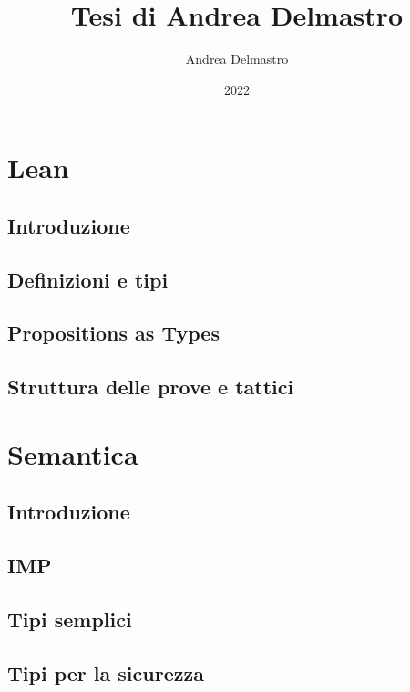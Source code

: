 \documentclass[oneside, 12pt, a4paper]{memoir}
\title{Tesi di Andrea Delmastro}
\author{Andrea Delmastro}
\date{2022}
\begin{document}
\frontmatter

\maketitle

\newpage


\newpage 
{
  \hypersetup{linkcolor=black}
  \tableofcontents
}

\mainmatter

\part{Lean}

\chapter{Introduzione}


\chapter{Definizioni e tipi}


\chapter{Propositions as Types}


\chapter{Struttura delle prove e tattici}


\part{Semantica} \label{semantica}

\chapter{Introduzione}


\chapter{IMP}


\chapter{Tipi semplici}


\chapter{Tipi per la sicurezza}
%


\backmatter
\medskip
\nocite{*}
\printbibliography
\end{document}
